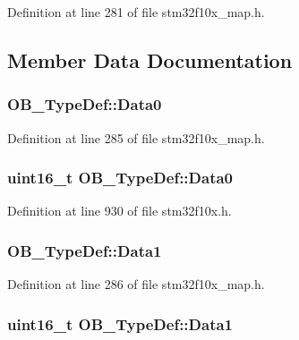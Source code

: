 Definition at line 281 of file stm32f10x\+\_\+map.\+h.



\subsection{Member Data Documentation}
\subsubsection[{\texorpdfstring{Data0}{Data0}}]{ O\+B\+\_\+\+Type\+Def\+::\+Data0}\hypertarget{struct_o_b___type_def_ab445cde85671bb0d3a417dbd4f144fad}{}\label{struct_o_b___type_def_ab445cde85671bb0d3a417dbd4f144fad}


Definition at line 285 of file stm32f10x\+\_\+map.\+h.

\subsubsection[{\texorpdfstring{Data0}{Data0}}]{ {\bf uint16\+\_\+t} O\+B\+\_\+\+Type\+Def\+::\+Data0}\hypertarget{struct_o_b___type_def_a7570c0ba4b4d31c6061d595279e6b36e}{}\label{struct_o_b___type_def_a7570c0ba4b4d31c6061d595279e6b36e}


Definition at line 930 of file stm32f10x.\+h.

\subsubsection[{\texorpdfstring{Data1}{Data1}}]{ O\+B\+\_\+\+Type\+Def\+::\+Data1}\hypertarget{struct_o_b___type_def_afcf3631c9eca46a2dc782dc9c51954fd}{}\label{struct_o_b___type_def_afcf3631c9eca46a2dc782dc9c51954fd}


Definition at line 286 of file stm32f10x\+\_\+map.\+h.

\subsubsection[{\texorpdfstring{Data1}{Data1}}]{ {\bf uint16\+\_\+t} O\+B\+\_\+\+Type\+Def\+::\+Data1}\hypertarget{struct_o_b___type_def_a4e0e4a89db7004fb08a8a19129e9970e}{}\label{struct_o_b___type_def_a4e0e4a89db7004fb08a8a19129e9970e}


